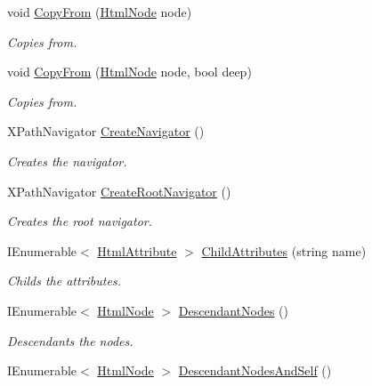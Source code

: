\begin{DoxyCompactItemize}
void \hyperlink{class_html_agility_pack_1_1_html_node_a7d1a61d5e9eeae58966572bcd0a712b1}{Copy\+From} (\hyperlink{class_html_agility_pack_1_1_html_node}{Html\+Node} node)
\begin{DoxyCompactList}\small\item\em Copies from. \end{DoxyCompactList}\item 
void \hyperlink{class_html_agility_pack_1_1_html_node_a6e9022ec07b83d20389c25c431812a49}{Copy\+From} (\hyperlink{class_html_agility_pack_1_1_html_node}{Html\+Node} node, bool deep)
\begin{DoxyCompactList}\small\item\em Copies from. \end{DoxyCompactList}\item 
X\+Path\+Navigator \hyperlink{class_html_agility_pack_1_1_html_node_aa879c6526cae140c1243aed7a0265b36}{Create\+Navigator} ()
\begin{DoxyCompactList}\small\item\em Creates the navigator. \end{DoxyCompactList}\item 
X\+Path\+Navigator \hyperlink{class_html_agility_pack_1_1_html_node_a48e03390c9e95693348e402fcb58ce45}{Create\+Root\+Navigator} ()
\begin{DoxyCompactList}\small\item\em Creates the root navigator. \end{DoxyCompactList}\item 
I\+Enumerable$<$ \hyperlink{class_html_agility_pack_1_1_html_attribute}{Html\+Attribute} $>$ \hyperlink{class_html_agility_pack_1_1_html_node_abf883a46d69731a438f6b5c00eb24564}{Child\+Attributes} (string name)
\begin{DoxyCompactList}\small\item\em Childs the attributes. \end{DoxyCompactList}\item 
I\+Enumerable$<$ \hyperlink{class_html_agility_pack_1_1_html_node}{Html\+Node} $>$ \hyperlink{class_html_agility_pack_1_1_html_node_aa709d57b50278e281891ee7ad56dda2a}{Descendant\+Nodes} ()
\begin{DoxyCompactList}\small\item\em Descendants the nodes. \end{DoxyCompactList}\item 
I\+Enumerable$<$ \hyperlink{class_html_agility_pack_1_1_html_node}{Html\+Node} $>$ \hyperlink{class_html_agility_pack_1_1_html_node_a314cb7d75d92db97963bdd2690c1c044}{Descendant\+Nodes\+And\+Self} ()

\end{DoxyCompactItemize}
